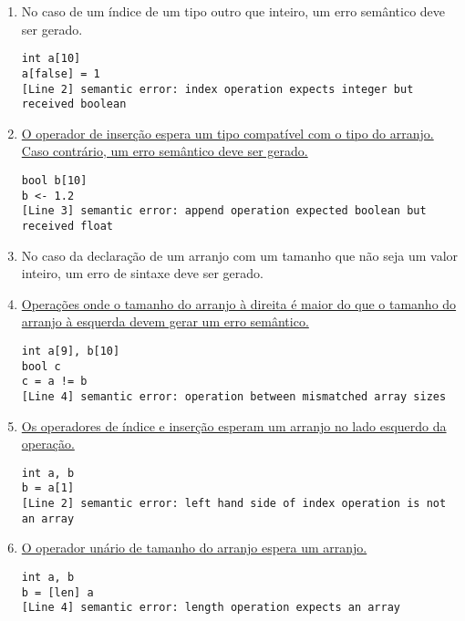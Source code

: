 \documentclass{sftex/sftex}
\newenvironment{smallenum}{
    \vspace{-1mm}
    \begin{enumerate}[label=\roman*.]
    \setlength{\parskip}{0pt}
    \setlength{\itemsep}{2pt}
}{
    \vspace{-2mm}
    \end{enumerate}
}
\begin{document}
\begin{smallenum}

\item No caso de um índice de um tipo outro que inteiro, um erro semântico
    deve ser gerado.

\begin{verbatim}
int a[10]
a[false] = 1
[Line 2] semantic error: index operation expects integer but received boolean
\end{verbatim}

\item \uline{O operador de inserção espera um tipo compatível com o tipo do
    arranjo. Caso contrário, um erro semântico deve ser gerado.}

\begin{verbatim}
bool b[10]
b <- 1.2
[Line 3] semantic error: append operation expected boolean but received float
\end{verbatim}

\item No caso da declaração de um arranjo com um tamanho que não seja um
    valor inteiro, um erro de sintaxe deve ser gerado.

\item \uline{Operações onde o tamanho do arranjo à direita é maior do que
    o tamanho do arranjo à esquerda devem gerar um erro semântico.}

\begin{verbatim}
int a[9], b[10]
bool c
c = a != b
[Line 4] semantic error: operation between mismatched array sizes
\end{verbatim}

\item \uline{Os operadores de índice e inserção esperam um arranjo no lado
    esquerdo da operação.}

\begin{verbatim}
int a, b
b = a[1]
[Line 2] semantic error: left hand side of index operation is not an array
\end{verbatim}

\item \uline{O operador unário de tamanho do arranjo espera um arranjo.}

\begin{verbatim}
int a, b
b = [len] a
[Line 4] semantic error: length operation expects an array
\end{verbatim}

\end{smallenum}
\end{document}

